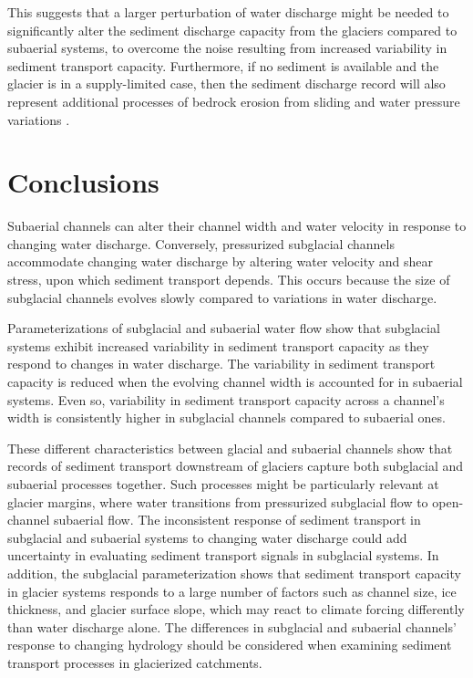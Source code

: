 \documentclass[draft]{agujournal2019}
\begin{document}
  
  This suggests that a larger  perturbation of water discharge might be needed to significantly alter the sediment discharge capacity from the glaciers compared to subaerial systems, to overcome the noise resulting from increased variability in sediment transport capacity.
Furthermore, if no sediment is available and the glacier is in a supply-limited case, then the sediment discharge record will also represent additional processes of bedrock erosion from sliding and water pressure variations  \cite{iverson2012,herman2015}.

 


\section{Conclusions}
  Subaerial channels can alter their channel width and water velocity in response to changing water discharge.
  Conversely, pressurized subglacial channels accommodate changing water discharge by altering water velocity and shear stress, upon which sediment transport depends.
  This occurs because the size of subglacial channels evolves slowly compared to variations in water discharge.
  
  
  Parameterizations of subglacial and subaerial water flow show that subglacial systems exhibit increased variability in sediment transport capacity as they respond  to changes in water discharge.
  The variability in sediment transport capacity is reduced when the evolving channel width is accounted for in subaerial systems.
  Even so, variability in sediment transport capacity across a channel's width is consistently higher in subglacial channels compared to subaerial ones.
  
  These different characteristics between glacial and subaerial channels show that records of sediment transport downstream of glaciers capture both subglacial and subaerial processes together.
  Such processes might be particularly relevant at glacier margins, where water transitions from pressurized subglacial flow to open-channel subaerial flow.
  The inconsistent response of sediment transport in subglacial and subaerial systems to changing water discharge could add uncertainty in evaluating  sediment transport signals in subglacial systems.
  In addition, the subglacial parameterization shows that sediment transport capacity in glacier systems responds to a large number of factors such as channel size, ice thickness, and glacier surface slope, which may react to climate forcing differently than water discharge alone. 
  The differences in subglacial and subaerial channels' response to changing hydrology should be considered when examining sediment transport processes in glacierized catchments.
\end{document}

